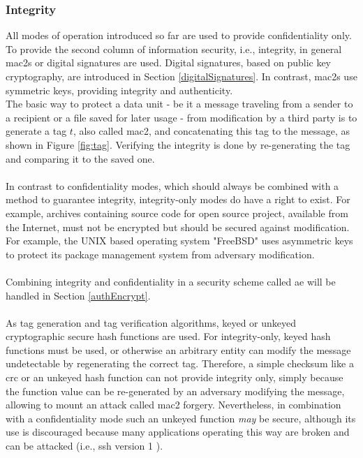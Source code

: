 \subsubsection{Integrity}\label{Integrity}
All modes of operation introduced so far are used to provide confidentiality only. To provide the second column of information security, i.e., integrity, in general
\glspl{mac2} or digital signatures are used.
Digital signatures, based on public key cryptography, are introduced in Section \ref{digitalSignatures}. In contrast, \glspl{mac2} use symmetric keys,
providing integrity and authenticity. 
\\
The basic way to protect a data unit - be it a message traveling from a sender to a recipient or a file saved for later usage - from modification by a third party is to
generate a tag $t$, also called \gls{mac2}, and concatenating this tag to the message, as shown in Figure \ref{fig:tag}.
Verifying the integrity is done by re-generating the tag and comparing it to the saved one. 
\\
\\
In contrast to confidentiality modes, which should always be combined with a method to guarantee integrity, 
integrity-only modes do have a right to exist. For example, archives containing source code for open source project, available from the Internet, must not be
encrypted but should be secured against modification. For example, the UNIX based operating system "FreeBSD" uses asymmetric keys to protect its package
management system from adversary modification.
\\
\\
Combining integrity and confidentiality in a security scheme called \gls{ae} will be handled in Section \ref{authEncrypt}.
\\
\\
As tag generation and tag verification algorithms, keyed or unkeyed cryptographic secure hash functions are used.
For integrity-only, keyed hash functions must be used, or
otherwise an arbitrary entity can modify the message undetectable by regenerating the correct tag. Therefore, a simple checksum like a \gls{crc} or an unkeyed 
hash function can not provide integrity only, simply because the function value can be re-generated by an adversary modifying the message, allowing to mount
an attack called \gls{mac2} forgery.
Nevertheless, in combination with a confidentiality mode such an unkeyed function \textit{may} be secure, although its use is discouraged because many applications operating
this way are broken and can be attacked (i.e., \gls{ssh} version 1 \cite{zalewskissh}).
